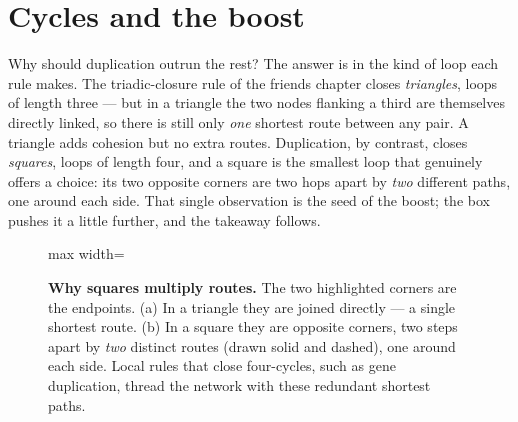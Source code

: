 \section{Cycles and the boost}

Why should duplication outrun the rest? The answer is in the kind of loop each
rule makes. The triadic-closure rule of the friends chapter closes
\emph{triangles}, loops of length three --- but in a triangle the two nodes
flanking a third are themselves directly linked, so there is still only \emph{one}
shortest route between any pair. A triangle adds cohesion but no extra routes.
Duplication, by contrast, closes \emph{squares}, loops of length four, and a
square is the smallest loop that genuinely offers a choice: its two opposite
corners are two hops apart by \emph{two} different paths, one around each side.
That single observation is the seed of the boost; the box pushes it a little
further, and the takeaway follows.

\begin{figure}[t]
\centering
\begin{adjustbox}{max width=\linewidth}\end{adjustbox}
\caption{\textbf{Why squares multiply routes.} The two highlighted corners are the
endpoints. (a) In a triangle they are joined directly --- a single shortest route.
(b) In a square they are opposite corners, two steps apart by \emph{two} distinct
routes (drawn solid and dashed), one around each side. Local rules that close
four-cycles, such as gene
duplication, thread the network with these redundant shortest paths.}
\label{fig:path-square}
\end{figure}

